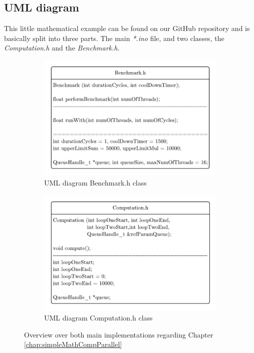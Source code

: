 \newpage

\subsection{UML diagram}

This little mathematical example can be found on our GitHub repository \parencite{internet12} and is basically split into three parts. The main \textit{*.ino} file, and two classes, the \textit{Computation.h} and the \textit{Benchmark.h}. 

\begin{figure}[htbp]
	\centering
	\begin{subfigure}{.5\textwidth}
		\centerline{\includegraphics[width=1\linewidth]{images/Benchmark-UML.pdf}}
		\caption{ UML diagram Benchmark.h class }
		\label{fig:benchUML}
	\end{subfigure}%
	\begin{subfigure}{.5\textwidth}
		\centerline{\includegraphics[width=1\linewidth]{images/Computation-UML.pdf}}
		\caption{ UML diagram Computation.h class }
		\label{fig:compUML}
	\end{subfigure}
	\caption{Overview over both main implementations regarding Chapter \ref{chap:simpleMathCompParallel}}
	\label{fig:umlDiagrBasicExample}
\end{figure}

